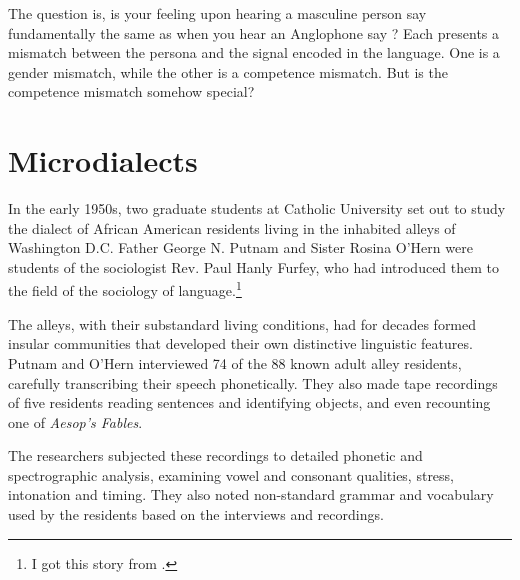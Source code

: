 \ea
    \z
\z

The question is, is your feeling upon hearing a masculine person say  fundamentally the same as when you hear an Anglophone say ? Each presents a mismatch between the persona and the signal encoded in the language. One is a gender mismatch, while the other is a competence mismatch. But is the competence mismatch somehow special?

\section{Microdialects}


In the early 1950s, two graduate students at Catholic University set out to study the dialect of African American residents living in the inhabited alleys of Washington D.C. Father George N. Putnam and Sister Rosina O'Hern were students of the sociologist Rev. Paul Hanly Furfey, who had introduced them to the field of the sociology of language.\footnote{I got this story from \citet[121--122]{Joseph2002}.}

The alleys, with their substandard living conditions, had for decades formed insular communities that developed their own distinctive linguistic features. Putnam and O'Hern interviewed 74 of the 88 known adult alley residents, carefully transcribing their speech phonetically. They also made tape recordings of five residents reading sentences and identifying objects, and even recounting one of \textit{Aesop's Fables}.

The researchers subjected these recordings to detailed phonetic and spectrographic analysis, examining vowel and consonant qualities, stress, intonation and timing. They also noted non-standard grammar and vocabulary used by the residents based on the interviews and recordings.

